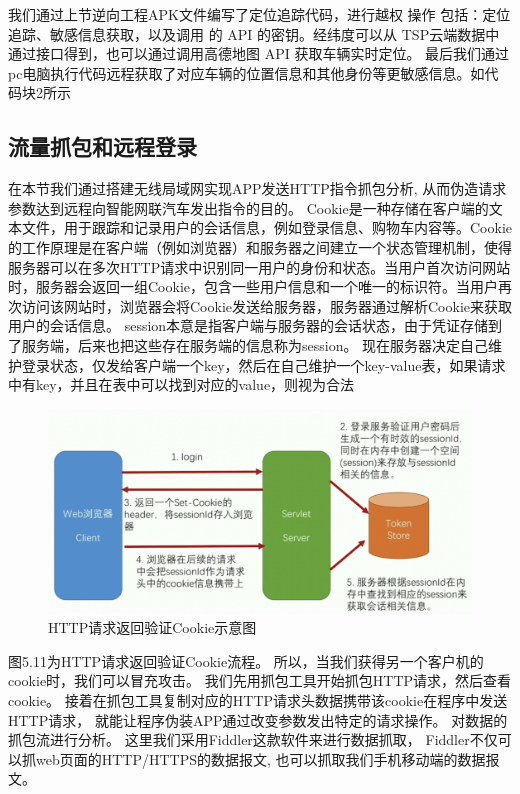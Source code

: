 我们通过上节逆向工程APK文件编写了定位追踪代码，进行越权
操作 包括：定位追踪、敏感信息获取，以及调用
的 API 的密钥。经纬度可以从 TSP云端数据中通过接口得到，也可以通过调用高德地图 API 获取车辆实时定位。
最后我们通过pc电脑执行代码远程获取了对应车辆的位置信息和其他身份等更敏感信息。如代码块2所示

\subsection{流量抓包和远程登录}
在本节我们通过搭建无线局域网实现APP发送HTTP指令抓包分析, 从而伪造请求参数达到远程向智能网联汽车发出指令的目的。
Cookie是一种存储在客户端的文本文件，用于跟踪和记录用户的会话信息，例如登录信息、购物车内容等。Cookie的工作原理是在客户端（例如浏览器）和服务器之间建立一个状态管理机制，使得服务器可以在多次HTTP请求中识别同一用户的身份和状态。当用户首次访问网站时，服务器会返回一组Cookie，包含一些用户信息和一个唯一的标识符。当用户再次访问该网站时，浏览器会将Cookie发送给服务器，服务器通过解析Cookie来获取用户的会话信息。
session本意是指客户端与服务器的会话状态，由于凭证存储到了服务端，后来也把这些存在服务端的信息称为session。
现在服务器决定自己维护登录状态，仅发给客户端一个key，然后在自己维护一个key-value表，如果请求中有key，并且在表中可以找到对应的value，则视为合法
\begin{figure}
  \centering
  \includegraphics[scale=0.5]{resources/img/i25.png}
  \caption{HTTP请求返回验证Cookie示意图}
\end{figure} 
图5.11为HTTP请求返回验证Cookie流程。
所以，当我们获得另一个客户机的 cookie时，我们可以冒充攻击。
我们先用抓包工具开始抓包HTTP请求，然后查看cookie。
接着在抓包工具复制对应的HTTP请求头数据携带该cookie在程序中发送HTTP请求，
就能让程序伪装APP通过改变参数发出特定的请求操作。
\newline
对数据的抓包流进行分析。
这里我们采用Fiddler\cite{crane2015fiddler}这款软件来进行数据抓取， Fiddler不仅可以抓web页面的HTTP/HTTPS的数据报文, 也可以抓取我们手机移动端的数据报文。
